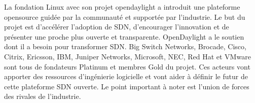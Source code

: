 
La fondation Linux avec son projet \gls{opendaylight} a introduit une plateforme \gls{opensource} guidée par la communauté et supportée par l'industrie. Le but du projet est d'accélérer l'adoption de SDN, d'encourager l'innovation et de présenter une proche plus ouverte et transparente. OpenDaylight a le soutien dont il a besoin pour transformer SDN. Big Switch Networks, Brocade, Cisco, Citrix, Ericsson, IBM, Juniper Networks, Microsoft, NEC, Red Hat et VMware sont tous de fondateurs Platinum et membres Gold du projet. Ces acteurs vont apporter des ressources d'ingénierie logicielle et vont aider à définir le futur de cette plateforme SDN ouverte. Le point important à noter est l'union de forces des rivales de l'industrie. \cite{ExecutiveGuideToSDNLinux}







